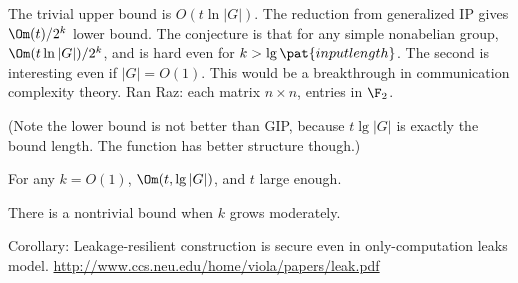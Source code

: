 The trivial upper bound is $O(t\ln |G|)$. The reduction from generalized IP gives $\Om(t)/2^k$ lower bound. %
The conjecture is that for any simple nonabelian group, $\Om(t\ln |G|)/2^k$, and is hard even for $k>\lg \pat{input length}$. The second is interesting even if $|G|=O(1)$.
This would be a breakthrough in communication complexity theory. %
Ran Raz: each matrix $n\times n$, entries in $\F_2$. 

(Note the lower bound is not better than GIP, because $t\lg |G|$ is exactly the bound length. The function has better structure though.)

\begin{thm}
For any $k=O(1)$, $\Om(t,\lg |G|)$, and $t$ large enough.
\end{thm}
There is a nontrivial bound when $k$ grows moderately.

Corollary: Leakage-resilient construction is secure even in only-computation leaks model. \url{http://www.ccs.neu.edu/home/viola/papers/leak.pdf}


